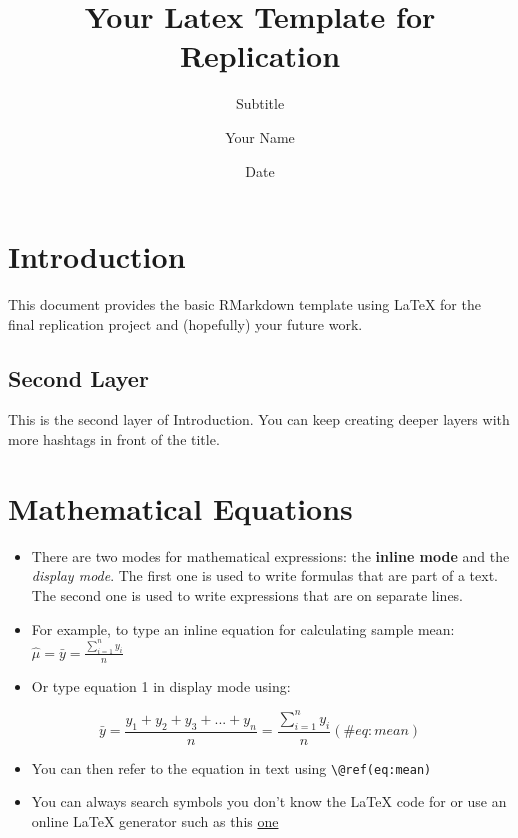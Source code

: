 \documentclass[
  12,
]{article}
\title{Your Latex Template for Replication}
\subtitle{Subtitle}
\author{Your Name}
\date{Date}
\begin{document}
\maketitle

\centerline{}

\section{Introduction}\label{introduction}

This document provides the basic RMarkdown template using LaTeX for the
final replication project and (hopefully) your future work.

\subsection{Second Layer}\label{second-layer}

This is the second layer of Introduction. You can keep creating deeper
layers with more hashtags in front of the title.

\section{Mathematical Equations}\label{mathematical-equations}

\begin{itemize}
\item
  There are two modes for mathematical expressions: the \textbf{inline
  mode} and the \emph{display mode}. The first one is used to write
  formulas that are part of a text. The second one is used to write
  expressions that are on separate lines.
\item
  For example, to type an inline equation for calculating sample mean:
  \(\hat{\mu} = \bar{y} = \frac{\sum_{i = 1}^{n}y_i}{n}\)
\item
  Or type equation 1 in display mode using:
\end{itemize}

\[
\bar{y} = \frac{y_1 + y_2 + y_3 + ... + y_n}{n} = \frac{\sum_{i = 1}^{n} y_i}{n}
(\#eq:mean)
\]

\begin{itemize}
\item
  You can then refer to the equation in text using
  \texttt{\textbackslash{}@ref(eq:mean)}
\item
  You can always search symbols you don't know the LaTeX code for or use
  an online LaTeX generator such as this
  \href{https://latexeditor.lagrida.com/}{one}
\end{itemize}
\end{document}
